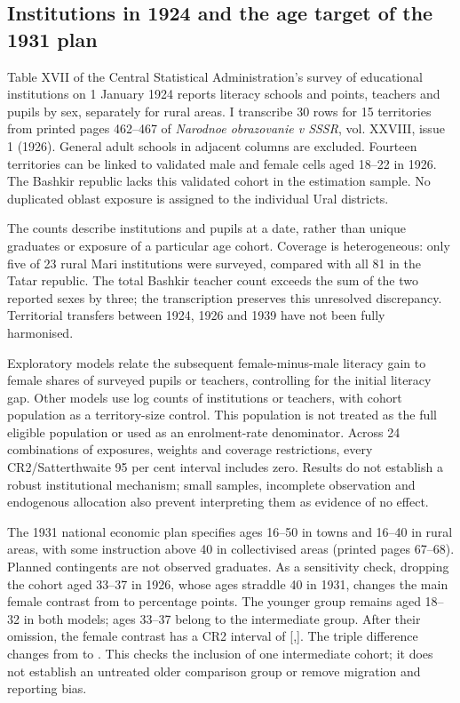 \subsection{Institutions in 1924 and the age target of the 1931 plan}
Table XVII of the Central Statistical Administration's survey of educational
institutions on 1 January 1924 reports literacy schools and points, teachers
and pupils by sex, separately for rural areas. I transcribe 30 rows for
15 territories from printed pages 462--467 of \emph{Narodnoe obrazovanie v
SSSR}, vol. XXVIII, issue 1 (1926). General adult schools in adjacent
columns are excluded. Fourteen territories can be linked to validated male
and female cells aged 18--22 in 1926. The Bashkir republic lacks this
validated cohort in the estimation sample. No duplicated oblast exposure
is assigned to the individual Ural districts.

The counts describe institutions and pupils at a date, rather than unique
graduates or exposure of a particular age cohort. Coverage is heterogeneous:
only five of 23 rural Mari institutions were surveyed, compared with all
81 in the Tatar republic. The total Bashkir teacher count exceeds the sum
of the two reported sexes by three; the transcription preserves this
unresolved discrepancy. Territorial transfers between 1924, 1926 and 1939
have not been fully harmonised.

Exploratory models relate the subsequent female-minus-male literacy gain
to female shares of surveyed pupils or teachers, controlling for the
initial literacy gap. Other models use log counts of institutions or
teachers, with cohort population as a territory-size control. This
population is not treated as the full eligible population or used as an
enrolment-rate denominator. Across 24 combinations of exposures, weights
and coverage restrictions, every CR2/Satterthwaite 95 per cent interval
includes zero. Results do not establish a robust institutional mechanism;
small samples, incomplete observation and endogenous allocation also
prevent interpreting them as evidence of no effect.

The 1931 national economic plan specifies ages 16--50 in towns and 16--40
in rural areas, with some instruction above 40 in collectivised areas
(printed pages 67--68). Planned contingents are not observed graduates.
As a sensitivity check, dropping the cohort aged 33--37 in 1926, whose
ages straddle 40 in 1931, changes the main female contrast from  to
 percentage points. The younger group remains aged 18--32 in both models; ages 33--37 belong to the intermediate group. After their omission, the female contrast has a CR2 interval of
[,]. The triple difference changes from  to .
This checks the inclusion of one intermediate cohort; it does not establish an untreated older
comparison group or remove migration and reporting bias.

